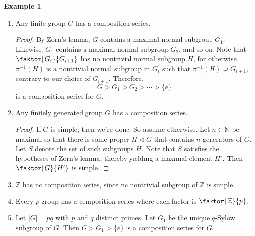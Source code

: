 \documentclass[10pt,letterpaper,cm]{nupset}
\theoremstyle{definition}
\newtheorem{exmp}[definition]{Example}
\theoremstyle{theorem}
\theoremstyle{remark}
\newcommand{\N}{\mathbb N}
\newcommand{\Z}{\mathbb Z}
\newcommand{\1}{\mathbf{1}}
\newcommand{\0}{\vec 0}
\begin{document}
\begin{exmp} $ $
\begin{enumerate}
\item Any finite group $G$ has a composition series.
\begin{proof}
By Zorn's lemma, $G$ contains a maximal normal subgroup $G_1$. Likewise, $G_1$ contains a maximal normal subgroup $G_2$, and so on. Note that $\faktor{G_i}{G_{i+1}}$ has no nontrivial normal subgroup $H$, for otherwise $\pi^{-1}(H)$ is a nontrivial normal subgroup in $G_i$ such that $\pi^{-1}(H) \supsetneq G_{i+1}$, contrary to our choice of $G_{i+1}$.  Therefore,  $$G> G_1 > G_2 > \cdots > \{e\}$$ is a composition series for $G$.
\end{proof}
\item Any finitely generated group $G$ has a composition series.
\begin{proof}
If $G$ is simple, then we're done. So assume otherwise. Let $n\in \N$ be maximal so that there is some proper $H \lhd G$ that contains $n$ generators of $G$. Let $S$ denote the set of such subgroups $H$. Note that $S$ satisfies the hypotheses of Zorn's lemma, thereby yielding a maximal element $H'$. Then $\faktor{G}{H'}$ is simple. 
\end{proof}
\item $\Z$ has no composition series, since no nontrivial subgroup of $\Z$ is simple.
\item Every $p$-group has a composition series where each factor is $\faktor{\Z}{p}$.
\item Let $\lvert{G}\rvert= pq$ with $p$ and $q$ distinct primes. Let $G_1$ be the unique $q$-Sylow subgroup of $G$. Then $G > G_1 > \{e\}$ is a composition series for $G$.
\end{enumerate}
\end{exmp}
\end{document}
